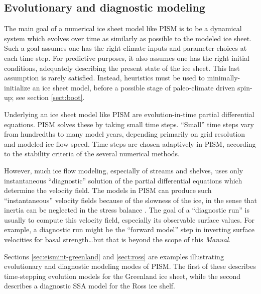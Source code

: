 \documentclass[titlepage,letterpaper,final]{scrartcl}
\begin{document}
\subsection{Evolutionary and diagnostic modeling} \label{subsect:basicmodes}    The main goal of a numerical ice sheet model like PISM is to be a dynamical system which evolves over time as similarly as possible to the modeled ice sheet.  Such a goal assumes one has the right climate inputs and parameter choices at each time step.  For predictive purposes, it also assumes one has the right initial conditions, adequately describing the present state of the ice sheet.  This last assumption is rarely satisfied.  Instead, heuristics must be used to minimally-initialize an ice sheet model, before a possible stage of paleo-climate driven spin-up; see section \ref{sect:boot}.

Underlying an ice sheet model like PISM are evolution-in-time partial differential equations.  PISM solves these by taking small time steps.  ``Small'' time steps vary from hundredths to many model years, depending primarily on grid resolution and modeled ice flow speed.  Time steps are chosen adaptively in PISM, according to the stability criteria of the several numerical methods.

However, much ice flow modeling, especially of streams and shelves, uses only instantaneous ``diagnostic'' solution of the partial differential equations which determine the velocity field.  The models in PISM can produce such ``instantaneous'' velocity fields because of the slowness of the ice, in the sense that inertia can be neglected in the stress balance \cite{Fowler}.  The goal of a ``diagnostic run'' is usually to compute this velocity field, especially its observable surface values.  For example, a diagnostic run might be the ``forward model'' step in inverting surface velocities for basal strength\dots but that is beyond the scope of this \emph{Manual}.

Sections \ref{sec:eismint-greenland} and \ref{sect:ross} are examples illustrating evolutionary and diagnostic modeling modes of PISM.  The first of these describes time-stepping evolution models for the Greenland ice sheet, while the second describes a diagnostic SSA model for the Ross ice shelf.
\end{document}
